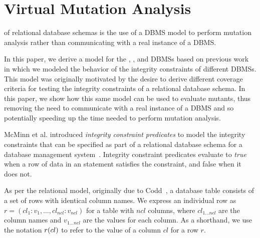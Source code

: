 


\vspace{-1ex}
\section{Virtual Mutation Analysis}
\label{sec:virtual-mutation-analysis}

\VMA of relational database schemas is the use of a DBMS model to perform mutation analysis rather than communicating with a real instance of a DBMS.

In this paper, we derive a model for the \HyperSQL, \Postgres, and \SQLite DBMSs based on previous work \cite{McMinn2015} in which we modeled the behavior of the integrity constraints of different DBMSs. This model was originally motivated by the desire to derive different coverage criteria for testing the integrity constraints of a relational database schema. In this paper, we show how this same model can be used to evaluate mutants, thus removing the need to communicate with a real instance of a DBMS and so potentially speeding up the time needed to perform mutation analysis.



McMinn et al. introduced {\it integrity constraint predicates} to model the integrity constraints that can be specified as part of a relational database schema for a database management system~\cite{McMinn2015}. Integrity constraint predicates evaluate to {\it true} when a row of data in an \INSERT statement satisfies the constraint, and false when it does not.

As per the relational model, originally due to Codd~\cite{Codd1970}, a database table consists of a set of rows with identical column names. We express an individual row as $r = (cl_1:v_1, \dots, cl_{ncl}:v_{ncl})$ for a table with $ncl$ columns, where $cl_{1 \ldots ncl}$ are the column names and $v_{1 \ldots ncl}$ are the values for each column. As a shorthand, we use the notation $r (cl)$ to refer to the value of a column $cl$ for a row $r$.

